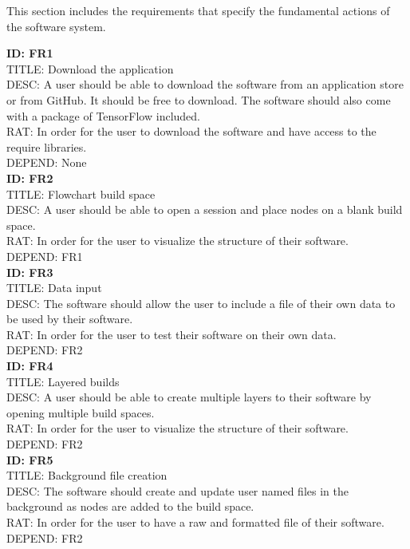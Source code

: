 \documentclass[a4paper,10pt]{article} \usepackage[margin=1.0in]{geometry} \usepackage{pdfpages} \usepackage{graphicx}
\begin{document}
This section includes the requirements that specify the fundamental actions of the software system.

\noindent
\textbf{ID: FR1}\\
TITLE: Download the application\\
DESC: A user should be able to download the software from an application store or from GitHub. It should be free to download. 
The software should also come with a package of TensorFlow included.\\
RAT: In order for the user to download the software and have access to the require libraries.\\
DEPEND: None\\

\noindent
\textbf{ID: FR2}\\
TITLE: Flowchart build space\\
DESC: A user should be able to open a session and place nodes on a blank build space.\\
RAT: In order for the user to visualize the structure of their software.\\
DEPEND: FR1\\

\noindent
\textbf{ID: FR3}\\
TITLE: Data input\\
DESC: The software should allow the user to include a file of their own data to be used by their software.\\
RAT: In order for the user to test their software on their own data.\\
DEPEND: FR2\\


\noindent
\textbf{ID: FR4}\\
TITLE: Layered builds\\
DESC: A user should be able to create multiple layers to their software by opening multiple build spaces.\\
RAT: In order for the user to visualize the structure of their software.\\
DEPEND: FR2\\

\noindent
\textbf{ID: FR5}\\
TITLE: Background file creation\\
DESC: The software should create and update user named files in the background as nodes are added to the build space.\\
RAT: In order for the user to have a raw and formatted file of their software.\\
DEPEND: FR2\\
\end{document}
